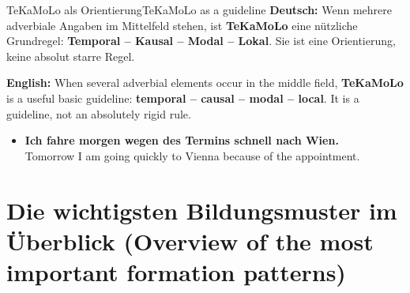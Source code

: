 \documentclass[a4paper,11pt]{article}
\newcommand{\GermanText}[1]{\textbf{Deutsch: }#1\par}
\newcommand{\EnglishText}[1]{{\small\color{SoftGray}\textbf{English: }#1\par}}
\newcommand{\ExampleItem}[2]{\item \textbf{#1}\\{\small\color{SoftGray}#2}}
\newcommand{\BSection}[2]{\section{#1 \textnormal{\small (#2)}}}
\begin{document}
\begin{grammarentry}{TeKaMoLo als Orientierung}{TeKaMoLo as a guideline}
\GermanText{Wenn mehrere adverbiale Angaben im Mittelfeld stehen, ist \textbf{TeKaMoLo} eine nützliche Grundregel: \textbf{Temporal -- Kausal -- Modal -- Lokal}. Sie ist eine Orientierung, keine absolut starre Regel.}
\EnglishText{When several adverbial elements occur in the middle field, \textbf{TeKaMoLo} is a useful basic guideline: \textbf{temporal -- causal -- modal -- local}. It is a guideline, not an absolutely rigid rule.}
\end{grammarentry}

\begin{exbox}
\begin{itemize}
\ExampleItem{Ich fahre morgen wegen des Termins schnell nach Wien.}{Tomorrow I am going quickly to Vienna because of the appointment.}
\end{itemize}
\end{exbox}

\BSection{Die wichtigsten Bildungsmuster im Überblick}{Overview of the most important formation patterns}
\end{document}

